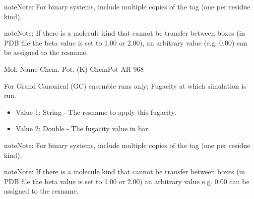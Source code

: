 \documentclass[letterpaper,10pt,english]{sphinxmanual}
\begin{document}
\begin{description}
\begin{itemize}
\end{itemize}

\begin{sphinxadmonition}{note}{Note:}
For binary systems, include multiple copies of the tag (one per residue kind).
\end{sphinxadmonition}

\begin{sphinxadmonition}{note}{Note:}
If there is a molecule kind that cannot be transfer between boxes (in PDB file the beta value is set to 1.00 or 2.00), an arbitrary value (e.g. 0.00) can be assigned to the resname.
\end{sphinxadmonition}

%
\begin{sphinxVerbatim}[commandchars=\\\{\}]
\PYGZsh{}\PYGZsh{}\PYGZsh{}\PYGZsh{}\PYGZsh{}\PYGZsh{}\PYGZsh{}\PYGZsh{}\PYGZsh{}\PYGZsh{}\PYGZsh{}\PYGZsh{}\PYGZsh{}\PYGZsh{}\PYGZsh{}\PYGZsh{}\PYGZsh{}\PYGZsh{}\PYGZsh{}\PYGZsh{}\PYGZsh{}\PYGZsh{}\PYGZsh{}\PYGZsh{}\PYGZsh{}\PYGZsh{}\PYGZsh{}\PYGZsh{}\PYGZsh{}\PYGZsh{}\PYGZsh{}\PYGZsh{}\PYGZsh{}
\PYGZsh{} Mol.  Name Chem.  Pot.  (K)
\PYGZsh{}\PYGZsh{}\PYGZsh{}\PYGZsh{}\PYGZsh{}\PYGZsh{}\PYGZsh{}\PYGZsh{}\PYGZsh{}\PYGZsh{}\PYGZsh{}\PYGZsh{}\PYGZsh{}\PYGZsh{}\PYGZsh{}\PYGZsh{}\PYGZsh{}\PYGZsh{}\PYGZsh{}\PYGZsh{}\PYGZsh{}\PYGZsh{}\PYGZsh{}\PYGZsh{}\PYGZsh{}\PYGZsh{}\PYGZsh{}\PYGZsh{}\PYGZsh{}\PYGZsh{}\PYGZsh{}\PYGZsh{}\PYGZsh{}
ChemPot AR \PYGZhy{}968
\end{sphinxVerbatim}

\item[{\sphinxcode{\sphinxupquote{Fugacity}}}] \leavevmode
For Grand Canonical (GC) ensemble runs only: Fugacity at which simulation is run.
\begin{itemize}
\item {} 
Value 1: String - The resname to apply this fugacity.

\item {} 
Value 2: Double - The fugacity value in bar.

\end{itemize}

\begin{sphinxadmonition}{note}{Note:}
For binary systems, include multiple copies of the tag (one per residue kind).
\end{sphinxadmonition}

\begin{sphinxadmonition}{note}{Note:}
If there is a molecule kind that cannot be transfer between boxes (in PDB file the beta value is set to 1.00 or 2.00) an arbitrary value e.g. 0.00 can be assigned to the resname.
\end{sphinxadmonition}


\end{description}
\end{document}

